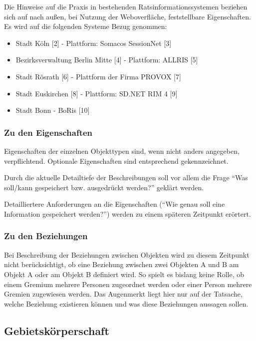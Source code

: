 \documentclass[,a4paper]{article}
\begin{document}
Die Hinweise auf die Praxis in bestehenden Ratsinformationssystemen
beziehen sich auf nach außen, bei Nutzung der Weboverfläche,
feststellbare Eigenschaften. Es wird auf die folgenden Systeme Bezug
genommen:

\begin{itemize}
\item
  Stadt Köln {[}2{]} - Plattform: Somacos SessionNet {[}3{]}
\item
  Bezirksverwaltung Berlin Mitte {[}4{]} - Plattform: ALLRIS {[}5{]}
\item
  Stadt Rösrath {[}6{]} - Plattform der Firma PROVOX {[}7{]}
\item
  Stadt Euskirchen {[}8{]} - Plattform: SD.NET RIM 4 {[}9{]}
\item
  Stadt Bonn - BoRis {[}10{]}
\end{itemize}

\subsubsection{Zu den Eigenschaften}

Eigenschaften der einzelnen Objekttypen sind, wenn nicht anders
angegeben, verpflichtend. Optionale Eigenschaften sind entsprechend
gekennzeichnet.

Durch die aktuelle Detailtiefe der Beschreibungen soll vor allem die
Frage ``Was soll/kann gespeichert bzw. ausgedrückt werden?'' geklärt
werden.

Detailliertere Anforderungen an die Eigenschaften (``Wie genau soll eine
Information gespeichert werden?'') werden zu einem späteren Zeitpunkt
erörtert.

\subsubsection{Zu den Beziehungen}

Bei Beschreibung der Beziehungen zwischen Objekten wird zu diesem
Zeitpunkt nicht berücksichtigt, ob eine Beziehung zwischen zwei Objekten
A und B am Objekt A oder am Objekt B definiert wird. So spielt es
bislang keine Rolle, ob einem Gremium mehrere Personen zugeordnet werden
oder einer Person mehrere Gremien zugewiesen werden. Das Augenmerkt
liegt hier nur auf der Tatsache, welche Beziehung existieren können und
was diese Beziehungen aussagen sollen.

\subsection{Gebietskörperschaft}
\end{document}
